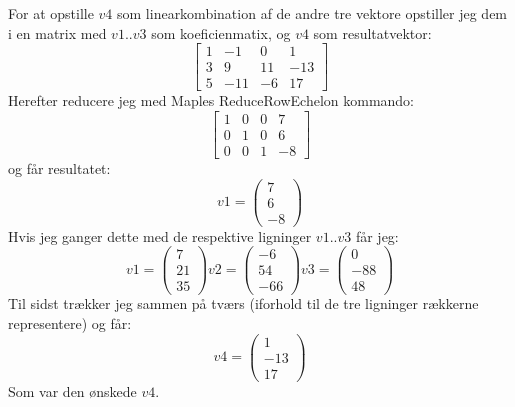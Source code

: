 For at opstille $v4$ som linearkombination af de andre tre vektore opstiller jeg
dem i en matrix med $v1..v3$ som koeficienmatix, og $v4$ som resultatvektor:
\begin{equation*}
\begin{bmatrix}
1 & -1 & 0 & 1\\
3 & 9 & 11 & -13\\
5 & -11 & -6 & 17
\end{bmatrix}
\end{equation*}
Herefter reducere jeg med Maples ReduceRowEchelon kommando:
\begin{equation*}
\begin{bmatrix}
1 & 0 & 0 & 7\\
0 & 1 & 0 & 6\\
0 & 0 & 1 & -8
\end{bmatrix}
\end{equation*}
og får resultatet:
\begin{equation*}
v1 = \left(
\begin{array}{c}
7\\
6\\
-8
\end{array}
\right)
\end{equation*}
Hvis jeg ganger dette med de respektive ligninger $v1..v3$ får jeg:
\begin{equation*}
v1 = \left(
\begin{array}{c}
7\\
21\\
35
\end{array}
\right)
v2 = \left(
\begin{array}{c}
-6\\
54\\
-66
\end{array}
\right)
v3 = \left(
\begin{array}{c}
0\\
-88\\
48
\end{array}
\right)
\end{equation*}
Til sidst trækker jeg sammen på tværs (iforhold til de tre ligninger rækkerne
representere) og får:
\begin{equation*}
v4 = \left(
\begin{array}{c}
1\\
-13\\
17
\end{array}
\right)
\end{equation*}
Som var den ønskede $v4$.












